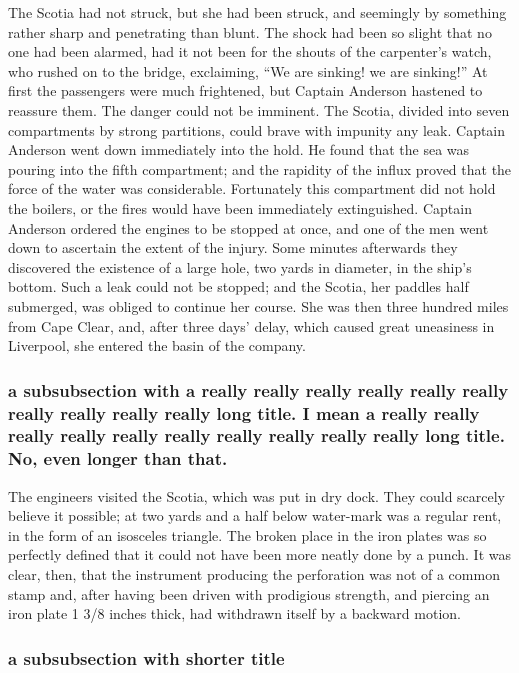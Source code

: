 The Scotia had not struck, but she had been struck, and seemingly
by something rather sharp and penetrating than blunt.
The shock had been so slight that no one had been alarmed,
had it not been for the shouts of the carpenter's watch,
who rushed on to the bridge, exclaiming, ``We are sinking! we
are sinking!''  At first the passengers were much frightened,
but Captain Anderson hastened to reassure them.  The danger could
not be imminent.  The Scotia, divided into seven compartments
by strong partitions, could brave with impunity any leak.
Captain Anderson went down immediately into the hold.
He found that the sea was pouring into the fifth compartment;
and the rapidity of the influx proved that the force of the water
was considerable.  Fortunately this compartment did not hold
the boilers, or the fires would have been immediately extinguished.
Captain Anderson ordered the engines to be stopped at once,
and one of the men went down to ascertain the extent of the injury.
Some minutes afterwards they discovered the existence of a
large hole, two yards in diameter, in the ship's bottom.
Such a leak could not be stopped; and the Scotia, her paddles
half submerged, was obliged to continue her course.  She was then
three hundred miles from Cape Clear, and, after three days' delay,
which caused great uneasiness in Liverpool, she entered the basin
of the company.

\subsubsection{a subsubsection with a really really really really really really really really really really long title. I mean a really really really really really really really really really really long title. No, even longer than that.}

The engineers visited the Scotia, which was put in dry dock.
They could scarcely believe it possible; at two yards and a half below
water-mark was a regular rent, in the form of an isosceles triangle.
The broken place in the iron plates was so perfectly defined
that it could not have been more neatly done by a punch.
It was clear, then, that the instrument producing the perforation
was not of a common stamp and, after having been driven with
prodigious strength, and piercing an iron plate 1 3/8 inches thick,
had withdrawn itself by a backward motion.

\subsubsection{a subsubsection with shorter title}

